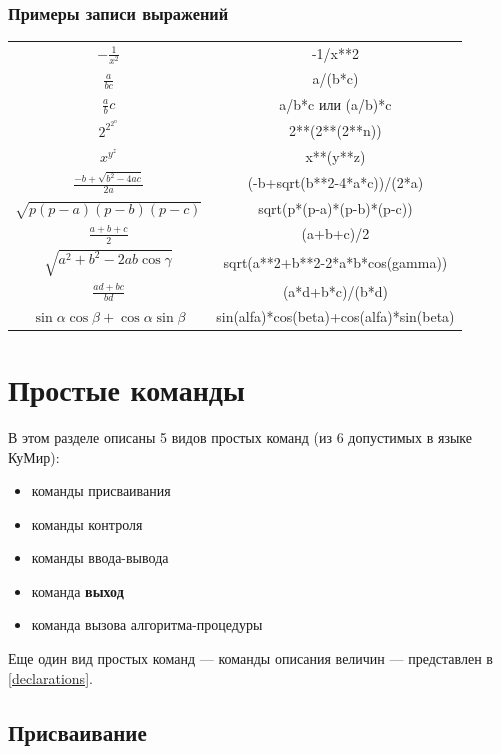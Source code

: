 \subsubsection{Примеры записи выражений}
\sffamily 
\begin{tabular}{||c|c||}
\hline
\hline
$\displaystyle -\frac{1}{x^2}$ & -1/x**2\\[1em]
$\displaystyle \frac{a}{bc}$ & a/(b*c)\\[1em]
$\displaystyle \frac{a}{b}c$ & a/b*c \textnormal{или} (a/b)*c\\[1em]
$\displaystyle 2^{2^{2^n}}$ & 2**(2**(2**n))\\[0.5em]
$\displaystyle x^{y^z}$ & x**(y**z)\\[0.5em]
$\displaystyle \frac{-b+\sqrt{b^2-4ac}}{2a}$ & (-b+sqrt(b**2-4*a*c))/(2*a)\\[0.75em]
$\displaystyle \sqrt{p(p-a)(p-b)(p-c)}$ & sqrt(p*(p-a)*(p-b)*(p-c))\\[0.5em]
$\displaystyle \frac{a+b+c}{2}$ & (a+b+c)/2\\[0.75em]
$\displaystyle \sqrt{a^2+b^2-2ab\cos\gamma}$ & sqrt(a**2+b**2-2*a*b*cos(gamma))\\[0.5em]
$\displaystyle \frac{ad+bc}{bd}$ & (a*d+b*c)/(b*d)\\[0.5em]
$\displaystyle \sin\alpha\cos\beta+\cos\alpha\sin\beta$ & sin(alfa)*cos(beta)+cos(alfa)*sin(beta)\\
\hline
\hline
\end{tabular}
\normalfont

\section{Простые команды}

В этом разделе описаны 5 видов простых команд (из 6 допустимых в языке КуМир):
\begin{itemize}
\item команды присваивания
\item команды контроля
\item команды ввода-вывода
\item команда \textbf{выход}
\item команда вызова алгоритма-процедуры
\end{itemize}
Еще один вид простых команд --- команды описания величин --- представлен в \ref{declarations}.

\subsection{Присваивание}

